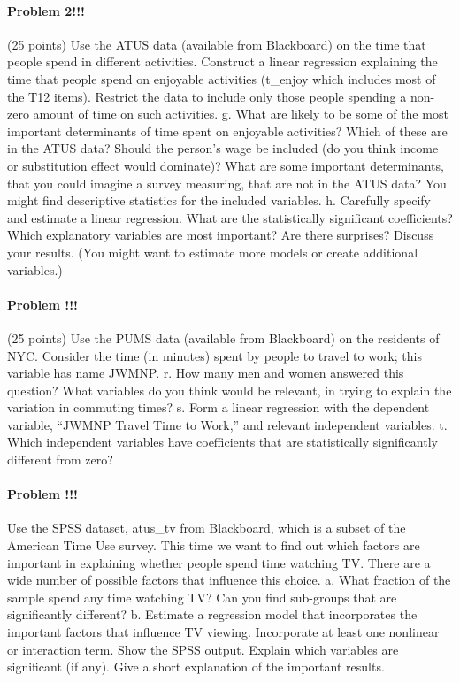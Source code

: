 \documentclass[]{article}
\let\oldparagraph\paragraph
\renewcommand{\paragraph}[1]{\oldparagraph{#1}\mbox{}}
\begin{document}
\paragraph{Problem 2!!!}\label{problem-2-1}

(25 points) Use the ATUS data (available from Blackboard) on the time
that people spend in different activities. Construct a linear regression
explaining the time that people spend on enjoyable activities (t\_enjoy
which includes most of the T12 items). Restrict the data to include only
those people spending a non-zero amount of time on such activities. g.
What are likely to be some of the most important determinants of time
spent on enjoyable activities? Which of these are in the ATUS data?
Should the person's wage be included (do you think income or
substitution effect would dominate)? What are some important
determinants, that you could imagine a survey measuring, that are not in
the ATUS data? You might find descriptive statistics for the included
variables. h. Carefully specify and estimate a linear regression. What
are the statistically significant coefficients? Which explanatory
variables are most important? Are there surprises? Discuss your results.
(You might want to estimate more models or create additional variables.)

\paragraph{Problem !!!}\label{problem-28}

(25 points) Use the PUMS data (available from Blackboard) on the
residents of NYC. Consider the time (in minutes) spent by people to
travel to work; this variable has name JWMNP. r. How many men and women
answered this question? What variables do you think would be relevant,
in trying to explain the variation in commuting times? s. Form a linear
regression with the dependent variable, ``JWMNP Travel Time to Work,''
and relevant independent variables. t. Which independent variables have
coefficients that are statistically significantly different from zero?

\paragraph{Problem !!!}\label{problem-29}

Use the SPSS dataset, atus\_tv from Blackboard, which is a subset of the
American Time Use survey. This time we want to find out which factors
are important in explaining whether people spend time watching TV. There
are a wide number of possible factors that influence this choice. a.
What fraction of the sample spend any time watching TV? Can you find
sub-groups that are significantly different? b. Estimate a regression
model that incorporates the important factors that influence TV viewing.
Incorporate at least one nonlinear or interaction term. Show the SPSS
output. Explain which variables are significant (if any). Give a short
explanation of the important results.
\end{document}
